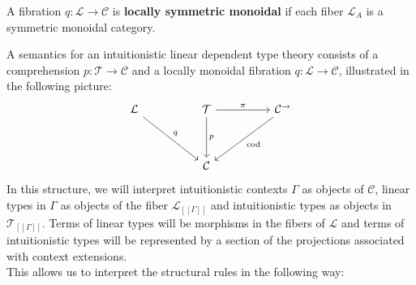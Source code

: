 \begin{defn}
A fibration $q : \mathcal{L} \to \mathcal{C}$ is \textbf{locally symmetric monoidal} if each fiber $\mathcal{L}_A$ is a symmetric monoidal category.
\end{defn}
A semantics for an intuitionistic linear dependent type theory consists of a comprehension $p : \mathcal{T} \to \mathcal{C}$ and a locally monoidal fibration $q : \mathcal{L} \to \mathcal{C}$, illustrated in the following picture:
\[
\ti
\mathcal{L} \ar[rd, "q"] & \mathcal{T} \ar[d, "p"] \ar[r, "\pi"] & \mathcal{C^\rightarrow} \ar[ld, "\text{cod}"]\\
& \mathcal{C}
\kz
\]
In this structure, we will interpret intuitionistic contexts $\Gamma$ as objects of $\mathcal{C}$, linear types in $\Gamma$ as objects of the fiber $\mathcal{L}_{[[\Gamma]]}$ and intuitionistic types as objects in $\mathcal{T}_{[[\Gamma]]}$. Terms of linear types will be morphisms in the fibers of $\mathcal{L}$ and terms of intuitionistic types will be represented by a section of the projections associated with context extensions.\\
This allows us to interpret the structural rules in the following way:
